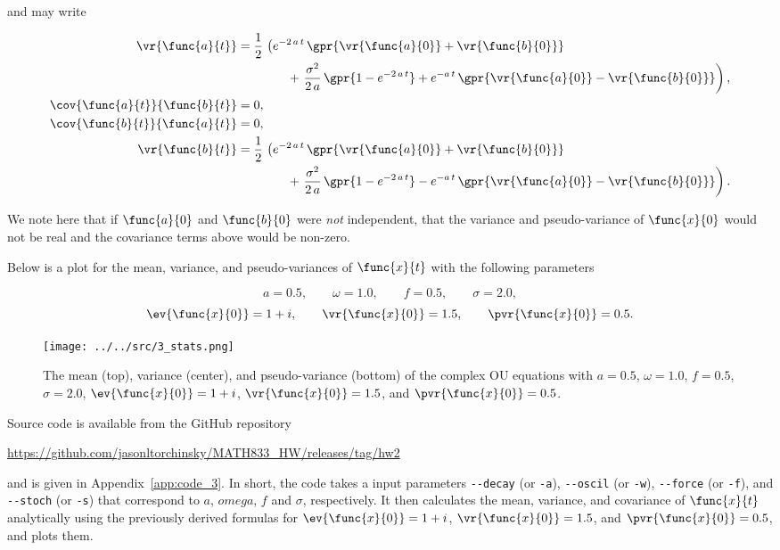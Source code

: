and may write

\begin{subequations}
	\begin{align}
		\vr{\func{a}{t}} &= \frac{1}{2}\,\left(e^{-2\,a\,t}\,\gpr{\vr{\func{a}{0}} + \vr{\func{b}{0}}} \right. \nonumber \\
			&\qquad\qquad + \left.\frac{\sigma^2}{2\,a}\,\gpr{1 - e^{-2\,a\,t}} + e^{-a\,t}\,\gpr{\vr{\func{a}{0}} - \vr{\func{b}{0}}}\right), \\
		\cov{\func{a}{t}}{\func{b}{t}} &= 0, \\
		\cov{\func{b}{t}}{\func{a}{t}} &= 0, \\
		\vr{\func{b}{t}} &= \frac{1}{2}\,\left(e^{-2\,a\,t}\,\gpr{\vr{\func{a}{0}} + \vr{\func{b}{0}}}\right. \nonumber \\
			&\qquad\qquad + \left.\frac{\sigma^2}{2\,a}\,\gpr{1 - e^{-2\,a\,t}} - e^{-a\,t}\,\gpr{\vr{\func{a}{0}} - \vr{\func{b}{0}}}\right).
	\end{align}
\end{subequations}

We note here that if $\func{a}{0}$ and $\func{b}{0}$ were \emph{not} independent, that the variance and pseudo-variance of $\func{x}{0}$ would not be real and the covariance terms above would be non-zero.

Below is a plot for the mean, variance, and pseudo-variances of $\func{x}{t}$ with the following parameters

$$
a = 0.5,\qquad \omega = 1.0,\qquad f = 0.5,\qquad \sigma = 2.0,
$$
$$
\ev{\func{x}{0}} = 1 + i,\qquad \vr{\func{x}{0}} = 1.5,\qquad \pvr{\func{x}{0}} = 0.5.
$$
	
\begin{figure}[H]
	\centering
	\texttt{[image: ../../src/3\_stats.png]}
	\caption{The mean (top), variance (center), and pseudo-variance (bottom) of the complex OU equations with $a = 0.5$, $\omega = 1.0$, $f = 0.5$, $\sigma = 2.0$, $\ev{\func{x}{0}} = 1 + i$, $\vr{\func{x}{0}} = 1.5$, and $\pvr{\func{x}{0}} = 0.5$.}
	\label{fig:stats_3}
\end{figure}
		
Source code is available from the GitHub repository
	
\begin{center}
	\url{https://github.com/jasonltorchinsky/MATH833_HW/releases/tag/hw2}
\end{center}

and is given in Appendix~\ref{app:code_3}. In short, the code takes a input parameters \texttt{-{}-decay} (or \texttt{-a}), \texttt{-{}-oscil} (or \texttt{-w}), \texttt{-{}-force} (or \texttt{-f}), and \texttt{-{}-stoch} (or \texttt{-s}) that correspond to $a$, $omega$, $f$ and $\sigma$, respectively. It then calculates the mean, variance, and covariance of $\func{x}{t}$ analytically using the previously derived formulas for $\ev{\func{x}{0}} = 1 + i$, $\vr{\func{x}{0}} = 1.5$, and $\pvr{\func{x}{0}} = 0.5$, and plots them.
